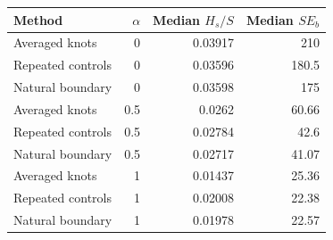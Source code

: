 \begin{tabular}{lrrr}
\toprule
Method & $\alpha$ & Median $H_s/S$ & Median $S E_b$ \\
\midrule
Averaged knots & 0 & 0.03917 & 210 \\
Repeated controls & 0 & 0.03596 & 180.5 \\
Natural boundary & 0 & 0.03598 & 175 \\
Averaged knots & 0.5 & 0.0262 & 60.66 \\
Repeated controls & 0.5 & 0.02784 & 42.6 \\
Natural boundary & 0.5 & 0.02717 & 41.07 \\
Averaged knots & 1 & 0.01437 & 25.36 \\
Repeated controls & 1 & 0.02008 & 22.38 \\
Natural boundary & 1 & 0.01978 & 22.57 \\
\bottomrule
\end{tabular}
